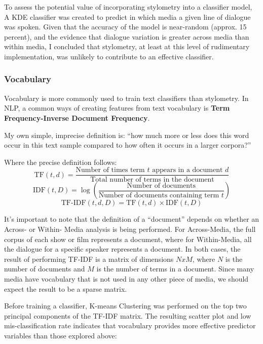\documentclass{article}
\begin{document}
\begin{titlepage}
To assess the potential value of incorporating stylometry into a classifier model, A KDE classifier was created to predict in which media a given line of dialogue was spoken. Given that the accuracy of the model is near-random (approx. 15 percent), and the evidence that dialogue variation is greater across media than within media, I concluded that stylometry, at least at this level of rudimentary implementation, was unlikely to contribute to an effective classifier.

\subsubsection{Vocabulary}

Vocabulary is more commonly used to train text classifiers than stylometry. In NLP, a common ways of creating features from text vocabulary is \textbf{Term Frequency-Inverse Document Frequency}.

My own simple, imprecise definition is: ``how much more or less does this word occur in this text sample compared to how often it occurs in a larger corpora?''

Where the precise definition follows:
\[
\text{TF}(t, d) = \frac{\text{Number of times term } t \text{ appears in a document } d}{\text{Total number of terms in the document}}
\]
\[
\text{IDF}(t, D) = \log \left( \frac{\text{Number of documents}}{\text{Number of documents containing term } t} \right)
\]
\[
\text{TF-IDF}(t, d, D) = \text{TF}(t, d) \times \text{IDF}(t, D)
\]

It's important to note that the definition of a ``document'' depends on whether an Across- or Within- Media analysis is being performed. For Across-Media, the full corpus of each show or film represents a document, where for Within-Media, all the dialogue for a specific speaker represents a document. In both cases, the result of performing TF-IDF is a matrix of dimensions $NxM$, where $N$ is the number of documents and $M$ is the number of terms in a document. Since many media have vocabulary that is not used in any other piece of media, we should expect the result to be a sparse matrix.

Before training a classifier, K-means Clustering was performed on the top two principal components of the TF-IDF matrix. The resulting scatter plot and low mis-classification rate indicates that vocabulary provides more effective predictor variables than those explored above:


\end{titlepage}
\end{document}
